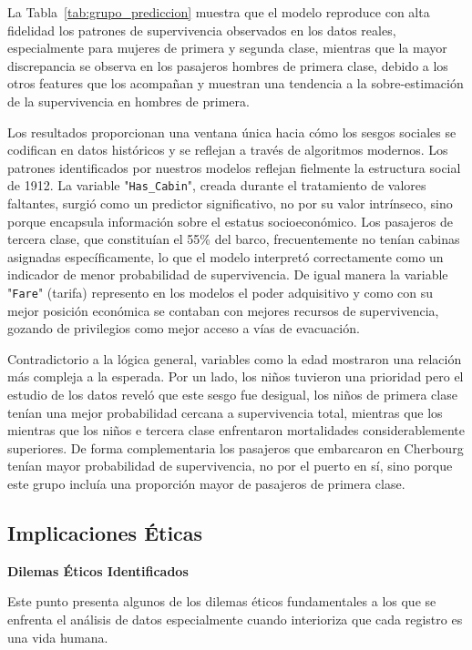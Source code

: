 \documentclass[conference]{IEEEtran}
\begin{document}
La Tabla~\ref{tab:grupo_prediccion} muestra que el modelo reproduce con alta fidelidad los patrones de supervivencia observados en los datos reales, especialmente para mujeres de primera y segunda clase, mientras que la mayor discrepancia se observa en los pasajeros hombres de primera clase, debido a los otros features que los acompañan y muestran una tendencia a la sobre-estimación de la supervivencia en hombres de primera.

Los resultados proporcionan una ventana única hacia cómo los sesgos sociales se codifican en datos históricos y se reflejan a través de algoritmos modernos. Los patrones identificados por nuestros modelos reflejan fielmente la estructura social de 1912. La variable "\texttt{Has\_Cabin}", creada durante el tratamiento de valores faltantes, surgió como un predictor significativo, no por su valor intrínseco, sino porque encapsula información sobre el estatus socioeconómico. Los pasajeros de tercera clase, que constituían el 55\% del barco, frecuentemente no tenían cabinas asignadas específicamente, lo que el modelo interpretó correctamente como un indicador de menor probabilidad de supervivencia. De igual manera la variable "\texttt{Fare}" (tarifa) represento en los modelos el poder adquisitivo y como con su mejor posición económica se contaban con mejores recursos de supervivencia, gozando de privilegios como mejor acceso a vías de evacuación.

Contradictorio a la lógica general, variables como la edad mostraron una relación más compleja a la esperada. Por un lado, los niños tuvieron una prioridad pero el estudio de los datos reveló que este sesgo fue desigual, los niños de primera clase tenían una mejor probabilidad cercana a supervivencia total, mientras que los mientras que los niños e tercera clase enfrentaron mortalidades considerablemente superiores. De forma complementaria los pasajeros que embarcaron en Cherbourg tenían mayor probabilidad de supervivencia, no por el puerto en sí, sino porque este grupo incluía una proporción mayor de pasajeros de primera clase.


\subsection{Implicaciones Éticas}

\textbf{Dilemas Éticos Identificados}

Este punto presenta algunos de los dilemas éticos fundamentales a los que se enfrenta el análisis de datos especialmente cuando interioriza que cada registro es una vida humana. \cite{miller2019interpretable} 
\end{document}
